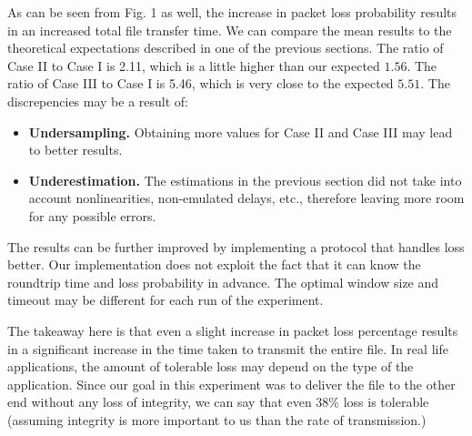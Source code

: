 \documentclass[conference]{IEEEtran}
\begin{document}
As can be seen from Fig. 1 as well, the increase in packet loss probability results in an
increased total file transfer time. We can compare the mean results to the theoretical
expectations described in one of the previous sections. The ratio of Case II to Case I
is 2.11, which is a little higher than our expected $1.56$. The ratio of Case III to Case I
is 5.46, which is very close to the expected $5.51$. The discrepencies may be a result of:

\begin{itemize}
    \item \textbf{Undersampling.} Obtaining more values for Case II and Case III may lead to
    better results.
    \item \textbf{Underestimation.} The estimations in the previous section did not take into account
    nonlinearities, non-emulated delays, etc., therefore leaving more room for any possible errors.
\end{itemize}

The results can be further improved by implementing a protocol that handles loss better. Our
implementation does not exploit the fact that it can know the roundtrip time and loss probability
in advance. The optimal window size and timeout may be different for each run of the experiment.

The takeaway here is that even a slight increase in packet loss percentage results in a significant
increase in the time taken to transmit the entire file. In real life applications, the amount of
tolerable loss may depend on the type of the application. Since our goal in this experiment was to
deliver the file to the other end without any loss of integrity, we can say that even 38\% loss is
tolerable (assuming integrity is more important to us than the rate of transmission.)
\end{document}
